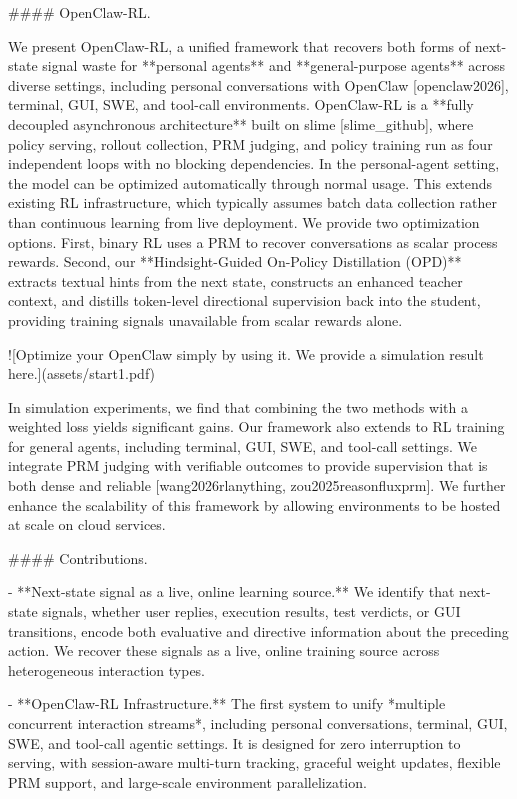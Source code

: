 #### OpenClaw-RL.

We present OpenClaw-RL, a unified framework that recovers both forms of next-state signal waste for **personal agents** and **general-purpose agents** across diverse settings, including personal conversations with OpenClaw [openclaw2026], terminal, GUI, SWE, and tool-call environments. OpenClaw-RL is a **fully decoupled asynchronous architecture** built on slime [slime_github], where policy serving, rollout collection, PRM judging, and policy training run as four independent loops with no blocking dependencies. In the personal-agent setting, the model can be optimized automatically through normal usage. This extends existing RL infrastructure, which typically assumes batch data collection rather than continuous learning from live deployment. We provide two optimization options. First, binary RL uses a PRM to recover conversations as scalar process rewards. Second, our **Hindsight-Guided On-Policy Distillation (OPD)** extracts textual hints from the next state, constructs an enhanced teacher context, and distills token-level directional supervision back into the student, providing training signals unavailable from scalar rewards alone.

![Optimize your OpenClaw simply by using it. We provide a simulation result here.](assets/start1.pdf)

In simulation experiments, we find that combining the two methods with a weighted loss yields significant gains. Our framework also extends to RL training for general agents, including terminal, GUI, SWE, and tool-call settings. We integrate PRM judging with verifiable outcomes to provide supervision that is both dense and reliable [wang2026rlanything, zou2025reasonfluxprm]. We further enhance the scalability of this framework by allowing environments to be hosted at scale on cloud services.

#### Contributions.

-   **Next-state signal as a live, online learning source.** We identify that next-state signals, whether user replies, execution results, test verdicts, or GUI transitions, encode both evaluative and directive information about the preceding action. We recover these signals as a live, online training source across heterogeneous interaction types.

-   **OpenClaw-RL Infrastructure.** The first system to unify *multiple concurrent interaction streams*, including personal conversations, terminal, GUI, SWE, and tool-call agentic settings. It is designed for zero interruption to serving, with session-aware multi-turn tracking, graceful weight updates, flexible PRM support, and large-scale environment parallelization.

